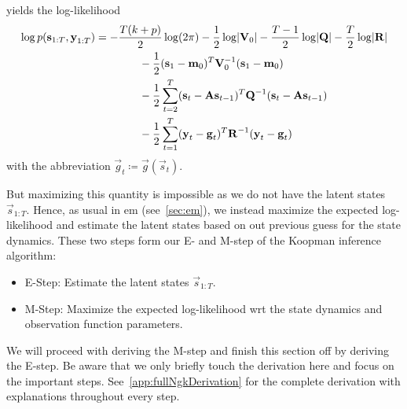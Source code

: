 	yields the log-likelihood
	\begin{align*}
		\log p(\boldsymbol{\mathrm{s}}_{1:T}, \boldsymbol{\mathrm{y}}_{1:T})
			&= -\frac{T(k + p)}{2} \log(2\pi) - \frac{1}{2} \log \lvert \boldsymbol{\mathrm{V}}_0 \rvert - \frac{T - 1}{2} \log \lvert \boldsymbol{\mathrm{Q}} \rvert - \frac{T}{2} \log \lvert \boldsymbol{\mathrm{R}} \rvert \\
			&\qquad\qquad -\frac{1}{2} (\boldsymbol{\mathrm{s}}_1 - \boldsymbol{\mathrm{m}}_0)^T \boldsymbol{\mathrm{V}}_0^{-1} (\boldsymbol{\mathrm{s}}_1 - \boldsymbol{\mathrm{m}}_0) \\
			&\qquad\qquad -\frac{1}{2} \sum_{t = 2}^{T} (\boldsymbol{\mathrm{s}}_t - \boldsymbol{\mathrm{A}} \boldsymbol{\mathrm{s}}_{t - 1})^T \boldsymbol{\mathrm{Q}}^{-1} (\boldsymbol{\mathrm{s}}_t - \boldsymbol{\mathrm{A}} \boldsymbol{\mathrm{s}}_{t - 1}) \\
			&\qquad\qquad -\frac{1}{2} \sum_{t = 1}^{T} (\boldsymbol{\mathrm{y}}_t - \boldsymbol{\mathrm{g}}_t)^T \boldsymbol{\mathrm{R}}^{-1} (\boldsymbol{\mathrm{y}}_t - \boldsymbol{\mathrm{g}}_t)
	\end{align*}
	with the abbreviation \( \vec{g}_t \coloneqq \vec{g}(\vec{s}_t) \).

	But maximizing this quantity is impossible as we do not have the latent states \( \vec{s}_{1:T} \). Hence, as usual in \ac{em} (see~\autoref{sec:em}), we instead maximize the expected log-likelihood and estimate the latent states based on out previous guess for the state dynamics. These two steps form our E- and M-step of the Koopman inference algorithm:
	\begin{itemize}
		\item E-Step: Estimate the latent states \( \vec{s}_{1:T} \).
		\item M-Step: Maximize the expected log-likelihood \ac{wrt} the state dynamics and observation function parameters.
	\end{itemize}
	We will proceed with deriving the M-step and finish this section off by deriving the E-step. Be aware that we only briefly touch the derivation here and focus on the important steps. See~\autoref{app:fullNgkDerivation} for the complete derivation with explanations throughout every step.

